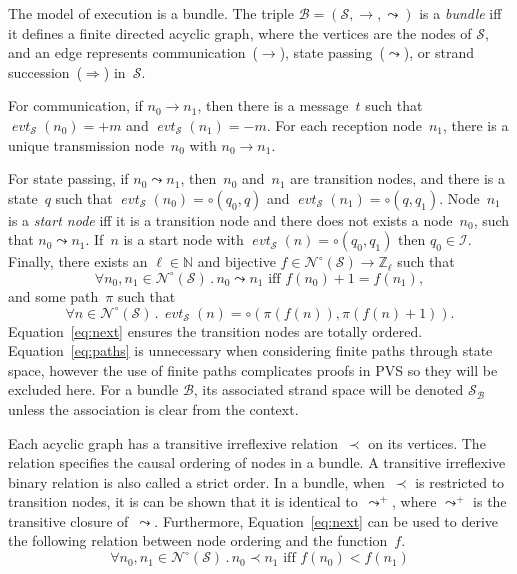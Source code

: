 \documentclass[12pt]{article}
\newcommand{\fn}[1]{\ensuremath{\operatorname{\mathit{#1}}}}
\newcommand{\inbnd}{\mathord -}
\newcommand{\outbnd}{\mathord +}
\newcommand{\neutral}{\mathord\circ}
\newcommand{\nat}{\ensuremath{\mathbb{N}}}
\newcommand{\zed}{\ensuremath{\mathbb{Z}}}
\newcommand{\all}[1]{\forall#1\mathpunct.}
\newcommand{\ssp}{\ensuremath{\mathcal{S}}}
\newcommand{\bun}{\ensuremath{\mathcal{B}}}
\newcommand{\nodes}{\ensuremath{\mathcal{N}}}
\newcommand{\nnodes}{\nodes^{\neutral}}
\newcommand{\init}{\ensuremath{\mathcal{I}}}
\newcommand{\pth}{\ensuremath{\pi}}
\newcommand{\evt}{\fn{evt}}
\begin{document}
The model of execution is a bundle.  The triple
$\bun=(\ssp,\to,\leadsto)$ is a \emph{bundle} iff it defines a finite
directed acyclic graph, where the vertices are the nodes of $\ssp$,
and an edge represents communication~($\to$), state
passing~($\leadsto$), or strand succession~($\Rightarrow$) in~$\ssp$.

For communication, if $n_0\rightarrow n_1$, then there is a
message~$t$ such that $\evt_\ssp(n_0)=\outbnd m$
and $\evt_\ssp(n_1)=\inbnd m$.  For each reception node~$n_1$, there
is a unique transmission node~$n_0$ with $n_0\to n_1$.

For state passing, if $n_0\leadsto n_1$, then~$n_0$ and~$n_1$ are
transition nodes, and there is a state~$q$ such that
$\evt_\ssp(n_0)=\neutral(q_0,q)$ and $\evt_\ssp(n_1)=\neutral(q,q_1)$.
Node~$n_1$ is a \emph{start node} iff it is a transition node and there
does not exists a node~$n_0$, such that $n_0\leadsto n_1$.  If~$n$ is
a start node with $\evt_\ssp(n)=\neutral(q_0,q_1)$ then $q_0\in\init$.
Finally, there exists an $\ell\in\nat$ and bijective
$f\in\nnodes(\ssp)\to\zed_\ell$ such that
\begin{equation}\label{eq:next}
\all{n_0,n_1\in\nnodes(\ssp)}n_0\leadsto n_1\mbox{ iff }f(n_0)+1=f(n_1),
\end{equation}
and some path~$\pth$ such that
\begin{equation}\label{eq:paths}
\all{n\in\nnodes(\ssp)}\evt_\ssp(n)=\neutral(\pth(f(n)), \pth(f(n)+1)).
\end{equation}
Equation~\ref{eq:next} ensures the transition nodes are totally
ordered.  Equation~\ref{eq:paths} is unnecessary when considering
finite paths through state space, however the use of finite paths
complicates proofs in PVS so they will be excluded here.  For a bundle
$\bun$, its associated strand space will be denoted $\ssp_\bun$ unless
the association is clear from the context.

Each acyclic graph has a transitive irreflexive relation~$\prec$ on
its vertices.  The relation specifies the causal ordering of nodes in
a bundle.  A transitive irreflexive binary relation is also called a
strict order.  In a bundle, when~$\prec$ is restricted to transition
nodes, it is can be shown that it is identical to~$\leadsto^+$, where
$\leadsto^+$ is the transitive closure of~$\leadsto$.  Furthermore,
Equation~\ref{eq:next} can be used to derive the following relation
between node ordering and the function~$f$.
\begin{equation}\label{eq:orderings}
\all{n_0,n_1\in\nnodes(\ssp)}n_0\prec n_1\mbox{ iff }f(n_0)<f(n_1)
\end{equation}
\end{document}
